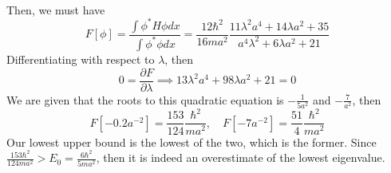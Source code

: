 \documentclass[a4paper]{article}
\begin{document}
\begin{ans}
\begin{enumerate}[label=(\alph*)]
\begin{eqnarray}
\end{eqnarray}
Then, we must have
$$F[\phi]=\frac{\int\phi^*H\phi dx}{\int\phi^*\phi dx}=\frac{12\hbar^2}{16ma^2}\frac{11\lambda^2a^4+14\lambda a^2+35}{a^4\lambda^2+6\lambda a^2+21}$$
Differentiating with respect to $\lambda$, then
$$0=\frac{\partial F}{\partial\lambda}\implies13\lambda^2a^4+98\lambda a^2+21=0$$
We are given that the roots to this quadratic equation is $-\frac{1}{5a^2}$ and $-\frac{7}{a^2}$, then
$$F[-0.2a^{-2}]=\frac{153}{124}\frac{\hbar^2}{ma^2},\quad F[-7a^{-2}]=\frac{51}{4}\frac{\hbar^2}{ma^2}$$
Our lowest upper bound is the lowest of the two, which is the former. Since $\frac{153\hbar^2}{124ma^2}>E_0=\frac{6\hbar^2}{5ma^2}$, then it is indeed an overestimate of the lowest eigenvalue.
\end{enumerate}
\end{ans}
\newpage
\end{document}
